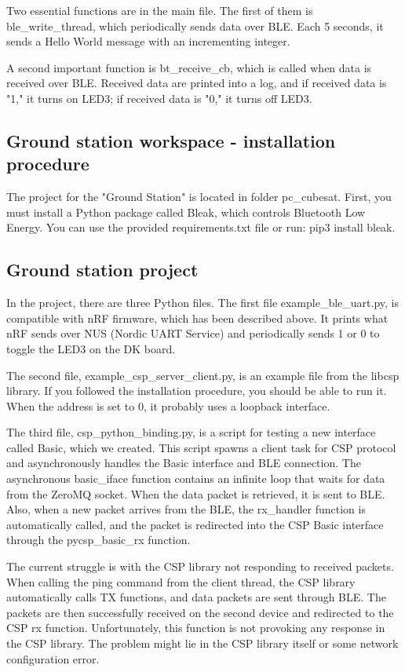 \documentclass[conference]{IEEEtran}
\begin{document}
Two essential functions are in the main file. The first of them is ble\_write\_thread, which periodically sends data over BLE. Each 5 seconds, it sends a Hello World message with an incrementing integer.

A second important function is bt\_receive\_cb, which is called when data is received over BLE. Received data are printed into a log, and if received data is "1," it turns on LED3; if received data is "0," it turns off LED3.

\subsection{Ground station workspace - installation procedure}
The project for the "Ground Station" is located in folder pc\_cubesat. First, you must install a Python package called Bleak, which controls Bluetooth Low Energy. You can use the provided requirements.txt file or run: pip3 install bleak.

\subsection{Ground station project}
In the project, there are three Python files. The first file example\_ble\_uart.py, is compatible with nRF firmware, which has been described above. It prints what nRF sends over NUS (Nordic UART Service) and periodically sends 1 or 0 to toggle the LED3 on the DK board.

The second file, example\_csp\_server\_client.py, is an example file from the libcsp library. If you followed the installation procedure, you should be able to run it. When the address is set to 0, it probably uses a loopback interface.

The third file, csp\_python\_binding.py, is a script for testing a new interface called Basic, which we created. This script spawns a client task for CSP protocol and asynchronously handles the Basic interface and BLE connection. The asynchronous basic\_iface function contains an infinite loop that waits for data from the ZeroMQ socket. When the data packet is retrieved, it is sent to BLE. Also, when a new packet arrives from the BLE, the rx\_handler function is automatically called, and the packet is redirected into the CSP Basic interface through the pycsp\_basic\_rx function.

The current struggle is with the CSP library not responding to received packets. When calling the ping command from the client thread, the CSP library automatically calls TX functions, and data packets are sent through BLE. The packets are then successfully received on the second device and redirected to the CSP rx function. Unfortunately, this function is not provoking any response in the CSP library. The problem might lie in the CSP library itself or some network configuration error.
\end{document}
